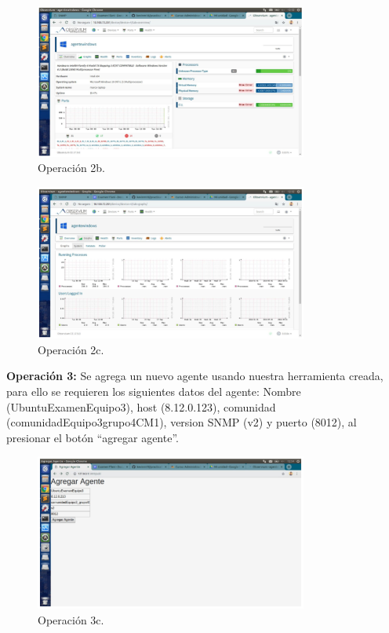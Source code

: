 \begin{figure}[htbp!]
	\centering
		\includegraphics[width=0.8\textwidth]{images/tarea3/op2b}
	\caption{Operación 2b.}
\end{figure}

\begin{figure}[htbp!]
	\centering
		\includegraphics[width=0.8\textwidth]{images/tarea3/op2c}
	\caption{Operación 2c.}
\end{figure}

\pagebreak
\noindent
\textbf{Operación 3:} Se agrega un nuevo agente usando nuestra herramienta creada, para ello se requieren los siguientes datos del agente: Nombre (UbuntuExamenEquipo3), host (8.12.0.123), comunidad (comunidadEquipo3grupo4CM1), version SNMP (v2) y puerto (8012), al presionar el botón “agregar agente”. 

\begin{figure}[htbp!]
	\centering
		\includegraphics[width=0.8\textwidth]{images/tarea3/op3a}
	\caption{Operación 3c.}
\end{figure}

